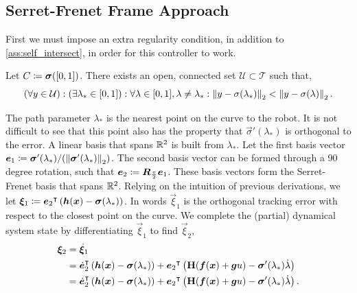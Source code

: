 \subsection{Serret-Frenet Frame Approach}
First we must impose an extra regularity condition, in addition to \eqref{ass:self_intersect}, in order for this controller to work.
\begin{assumption}
    Let $C\coloneqq\bm{\sigma}([0,1])$. There exists an open, connected set $\mathcal{U}\subset\mathcal{T}$ such that,
    \begin{equation*}
        (\forall y\in\mathcal{U}) : (\exists \lambda_* \in [0,1]) : \forall \lambda\in[0,1], \lambda\neq\lambda_* : \mathop{}\!\left\|y - \sigma(\lambda_*)\right\|_2 < \mathop{}\!\left\|y - \sigma(\lambda)\right\|_2.
    \end{equation*}
    \label{ass:unique_operating}
\end{assumption}
The path parameter $\lambda_*$ is the nearest point on the curve to the robot. It is not difficult to see that this point also has the property that $\vec{\sigma}'(\lambda_*)$ is orthogonal to the error. A linear basis that spans $\mathbb{R}^2$ is built from $\lambda_*$. Let the first basis vector $\bm{e}_1 \coloneqq \bm{\sigma}'(\lambda_*)/(\mathop{}\!\left\|\bm{\sigma}'(\lambda_*)\right\|_2)$. The second basis vector can be formed through a 90 degree rotation, such that $\bm{e}_2 \coloneqq \bm{R}_{\frac{\pi}{2}}\bm{e}_1$. These basis vectors form the Serret-Frenet basis that spans $\mathbb{R}^2$. Relying on the intuition of previous derivations, we let $\bm{\xi}_1 \coloneqq {\bm{e}_2}^{\intercal}\left(\bm{h}(\bm{x}) - \bm{\sigma}(\lambda_*)\right)$. In words $\vec{\xi}_1$ is the orthogonal tracking error with respect to the closest point on the curve. We complete the (partial) dynamical system state by differentiating $\vec{\xi}_1$ to find $\vec{\xi}_2$,
\begin{align*}
    \bm{\xi}_2     &=  \dot{\bm{\xi}}_1\\
                    &=  {\dot{\bm{e}}_2}^{\intercal}\left(\bm{h}(\bm{x}) - \bm{\sigma}(\lambda_*)\right)
                        +
                        {\bm{e}_2}^{\intercal}\left(\mathbf{H}(\bm{f}(\bm{x}) + \bm{g}u) - \bm{\sigma}'(\lambda_*)\dot{\lambda} \right)\\
                    &=  {\dot{\bm{e}}_2}^{\intercal}\left(\bm{h}(\bm{x}) - \bm{\sigma}(\lambda_*)\right)
                        +
                        {\bm{e}_2}^{\intercal}\left(\mathbf{H}(\bm{f}(\bm{x}) + \bm{g}u) - \bm{\sigma}'(\lambda_*)\dot{\lambda} \right).
\end{align*}
